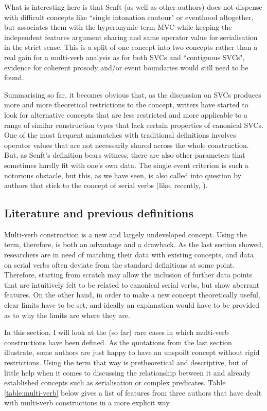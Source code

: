 What is interesting here is that Senft (as well as other authors) does not dispense with difficult concepts like ``single intonation contour" or eventhood altogether, but associates them with the hyperonymic term MVC while keeping the independent features argument sharing and same operator value for serialisation in the strict sense. This is a split of one concept into two concepts rather than a real gain for a multi-verb analysis as for both SVCs and ``contiguous SVCs", evidence for coherent prosody and/or event boundaries would still need to be found.

Summarising so far, it becomes obvious that, as the discussion on SVCs produces more and more theoretical restrictions to the concept, writers have started to look for alternative concepts that are less restricted and more applicable to a range of similar construction types that lack certain properties of canonical SVCs. One of the most frequent mismatches with traditional definitions involves operator values that are not necessarily shared across the whole construction. But, as Senft's definition bears witness, there are also other parameters that sometimes hardly fit with one's own data. The single event criterion is such a notorious obstacle, but this, as we have seen, is also called into question by authors that stick to the concept of serial verbs (like, recently, \citealt{haspelmath2016serial}). 

\subsection{Literature and previous definitions} \label{sec:literature-mvcs}

Multi-verb construction is a new and largely undeveloped concept. Using the term, therefore, is both an advantage and a drawback. As the last section showed, researchers are in need of matching their data with existing concepts, and data on serial verbs often deviate from the standard definitions at some point. Therefore, starting from scratch may allow the inclusion of further data points that are intuitively felt to be related to canonical serial verbs, but show aberrant features. On the other hand, in order to make a new concept theoretically useful, clear limits have to be set, and ideally an explanation would have to be provided as to why the limits are where they are. 

In this section, I will look at the (so far) rare cases in which multi-verb constructions have been defined. As the quotations from the last section illustrate, some authors are just happy to have an unspoilt concept without rigid restrictions. Using the term that way is pretheoretical and descriptive, but of little help when it comes to discussing the relationship between it and already established concepts such as serialisation or complex predicates. Table \ref{table:multi-verb} below gives a list of features from three authors that have dealt with multi-verb constructions in a more explicit way.

